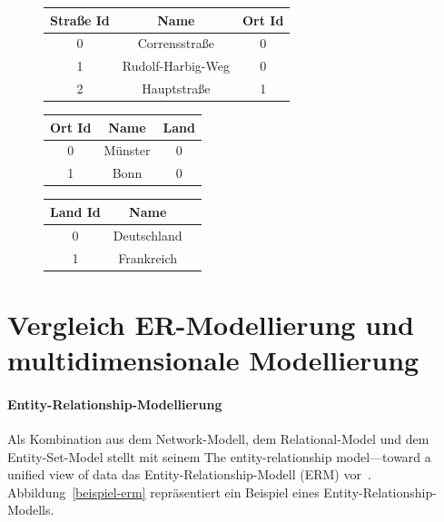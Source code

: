\documentclass[
  language=german, %
  type=bachelor%
]{isthesis}
\begin{document}
\begin{content}
  \begin{figure}[caption={Beispiel der Dimensionstabellen \textit{Ort} im Snowflake-Schema}, label={table:dimension-table}]
    \footnotesize
    \begin{tabular}{c c c }
      Straße Id & Name & Ort Id \\
      \toprule
      0 & Corrensstraße & 0 \\
      1 & Rudolf-Harbig-Weg & 0 \\
      2 & Hauptstraße & 1 \\
    \end{tabular}
    \begin{tabular}{c c c}
      Ort Id & Name & Land \\
      \toprule
      0 & Münster & 0 \\
      1 & Bonn & 0 \\
    \end{tabular}
    \begin{tabular}{c c c }
      Land Id & Name \\
      \toprule
      0 & Deutschland \\
      1 & Frankreich \\
    \end{tabular}
  \end{figure}

  \section{Vergleich ER-Modellierung und multidimensionale Modellierung}

  \paragraph{Entity-Relationship-Modellierung}
  Als Kombination aus dem Network-Modell, dem Relational-Model und dem
  Entity-Set-Model stellt \citeauthor{chen1976entity} \citeyear{chen1976entity}
  mit seinem   \glqq{}The entity-relationship
  model—toward a unified view of data\grqq{} das Entity-Relationship-Modell
  (ERM) vor~\cite[][S. 2]{chen1976entity}. Abbildung~\ref{beispiel-erm}
  repräsentiert ein Beispiel eines Entity-Relationship-Modells.


\end{content}
\end{document}
